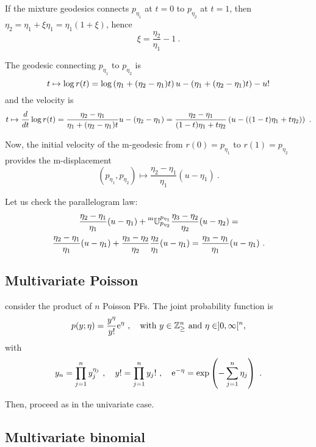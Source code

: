 \documentclass[12pt,a4paper]{amsart}
\begin{document}
If the mixture geodesics connects $p_{\eta_1}$ at $t = 0$ to $p_{\eta_2}$ at $t = 1$, then $\eta_2 = \eta_1 + \xi \eta_1 = \eta_1 (1 + \xi)$, hence
\begin{equation}
    \xi = \frac {\eta_2}{\eta_1} - 1 \ .
\end{equation}

The geodesic connecting $p_{\eta_1}$ to $p_{\eta_2}$ is
\begin{equation}
  \label{eq:24}
t \mapsto \log r(t) = \log\left(\eta_1 + (\eta_2- \eta_1)t\right) u - \left(\eta_1 + (\eta_2-\eta_1) t \right) - u!
\end{equation}
and the velocity is
\begin{equation}
  \label{eq:25}
t \mapsto \frac{d}{dt} \log r(t) = \frac {\eta_2 - \eta_1}{\eta_1 + (\eta_2 - \eta_1)t} u - (\eta_2 - \eta_1) =
\frac {\eta_2 - \eta_1}{(1-t) \eta_1 + t \eta_2} \left(u - ((1-t) \eta_1 + t \eta_2) \right) \ .
\end{equation}

Now, the initial velocity of the m-geodesic from $r(0) = p_{\eta_1}$ to $r(1) = p_{\eta_2}$ provides the m-displacement
\begin{equation}
    (p_{\eta_1}, p_{\eta_2}) \mapsto \frac {\eta_2 - \eta_1}{\eta_1} (u - \eta_1) \ .
    \end{equation}

Let us check the parallelogram law:
\begin{multline}
\frac {\eta_2 - \eta_1}{\eta_1} (u - \eta_1) + \prescript{\text{m}}{} {\mathbb U} _ {p_{\eta_2}} ^ {p_{\eta_1}} \frac {\eta_3 - \eta_2}{\eta_2} (u - \eta_2) = \\
\frac {\eta_2 - \eta_1}{\eta_1} (u - \eta_1) + \frac {\eta_3 - \eta_2}{\eta_2} \frac {\eta_2}{\eta_1} (u - \eta_1) =
\frac {\eta_3 - \eta_1}{\eta_1} (u - \eta_1) \ .\end{multline}
\subsection{Multivariate Poisson}
\label{sec:multivariate-poisson}

consider the product of $n$ Poisson PFs. The joint probability function is
\begin{equation}
    p(y;\eta) = \frac {y^\eta}{y!} \mathrm{e}^{\eta} \ , \quad \text{with $y \in \mathbb{Z}_\ge^n$ and $\eta \in ]0,\infty[^n$,}
\end{equation}
with\begin{equation}
    y_n = \prod_{j=1}^n y_j^{\eta_j}\ , \quad y! = \prod_{j=1}^n y_j! \ ,\quad \mathrm{e}^{-\eta} = \exp\left(- \sum_{j=1}^n \eta_j\right) \ .
\end{equation}

Then, proceed as in the univariate case.

\subsection{Multivariate binomial}
\label{sec:mult-binom}


% 


\end{document}
